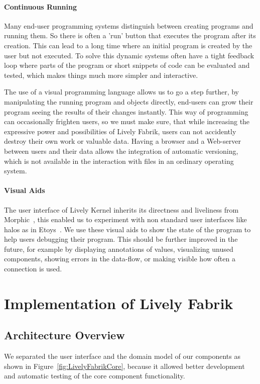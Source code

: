 \documentclass[pdftex, times, 10pt, twocolumn]{article}
\begin{document}
\paragraph{Continuous Running}
Many end-user programming systems distinguish between creating programs and running them. So there is often a 'run' button that executes the program after its creation. This can lead to a long time where an initial program is created by the user but not executed. To solve this dynamic systems often have a tight feedback loop where parts of the program or short snippets of code can be evaluated and tested, which makes things much more simpler and interactive. 

The use of a visual programming language allows us to go a step further, by manipulating the running program and objects directly, end-users can grow their program seeing the results of their changes instantly. This way of programming can occasionally frighten users, so we must make sure, that while increasing the expressive power and possibilities of Lively Fabrik, users can not accidently destroy their own work or valuable data. Having a browser and a Web-server between users and their data allows the integration of automatic versioning, which is not available in the interaction with files in an ordinary operating system.  



\paragraph{Visual Aids}
The user interface of Lively Kernel inherits its directness and liveliness from Morphic~\cite{Maloney1995DLM}, this enabled us to experiment with non standard user interfaces like halos as in Etoys~\cite{Kay2005SEA}. We use these  visual aids to show the state of the program to help users debugging their program. This should be further improved in the future, for example by displaying annotations of values, visualizing unused components, showing errors in the data-flow, or making visible how often a connection is used. 



\section{Implementation of Lively Fabrik}


\subsection{Architecture Overview}
We separated the user interface and the domain model of our components as shown in Figure~\ref{fig:LivelyFabrikCore}, because it allowed better development and automatic testing of the core component functionality.  
\end{document}
